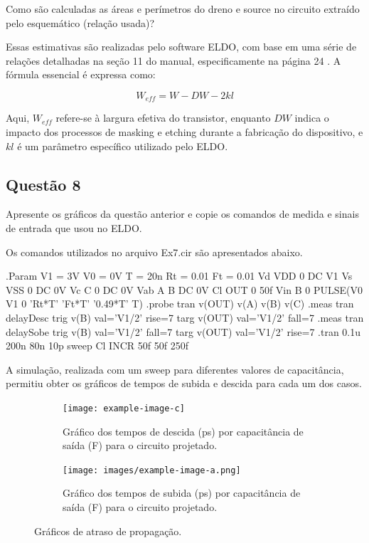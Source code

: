 \documentclass[12pt,a4paper]{article}
\begin{document}
Como são calculadas as áreas e perímetros do dreno e source no circuito extraído pelo esquemático (relação usada)?

Essas estimativas são realizadas pelo software ELDO, com base em uma série de relações detalhadas na seção 11 do manual, especificamente na página 24 \cite{ref1}. A fórmula essencial é expressa como:

$$
W_{eff} = W - DW - 2kl
$$

Aqui, $W_{eff}$ refere-se à largura efetiva do transistor, enquanto $DW$ indica o impacto dos processos de masking e etching durante a fabricação do dispositivo, e $kl$ é um parâmetro específico utilizado pelo ELDO.

\subsection*{Questão 8}

Apresente os gráficos da questão anterior e copie os comandos de medida e sinais de entrada que usou no ELDO.

Os comandos utilizados no arquivo Ex7.cir são apresentados abaixo.

\begin{codeblock}[title={Comandos ELDO}, label={lst:eldo_commands}, listing options={language=TeX}]
.Param V1 = 3V V0 = 0V T = 20n Rt = 0.01 Ft = 0.01
Vd VDD 0 DC V1
Vs VSS 0 DC 0V
Vc C 0 DC 0V
Vab A B DC 0V
Cl OUT 0 50f
Vin B 0 PULSE(V0 V1 0 'Rt*T' 'Ft*T' '0.49*T' T)
.probe tran v(OUT) v(A) v(B) v(C)
.meas tran delayDesc trig v(B) val='V1/2' rise=7 targ v(OUT) val='V1/2'
fall=7
.meas tran delaySobe trig v(B) val='V1/2' fall=7 targ v(OUT) val='V1/2'
rise=7
.tran 0.1u 200n 80n 10p sweep Cl INCR 50f 50f 250f
\end{codeblock}

A simulação, realizada com um sweep para diferentes valores de capacitância, permitiu obter os gráficos de tempos de subida e descida para cada um dos casos.

\begin{figure}[H]
    \centering
    \begin{subfigure}[b]{0.48\textwidth}
        \texttt{[image: example-image-c]}
        \caption{Gráfico dos tempos de descida (ps) por capacitância de saída (F) para o circuito projetado.}
        \label{fig:delay_descida}
    \end{subfigure}
    \hfill
    \begin{subfigure}[b]{0.48\textwidth}
        \texttt{[image: images/example-image-a.png]}
        \caption{Gráfico dos tempos de subida (ps) por capacitância de saída (F) para o circuito projetado.}
        \label{fig:delay_subida}
    \end{subfigure}
    \caption{Gráficos de atraso de propagação.}
    \label{fig:delay_graphs}
\end{figure}
\end{document}
